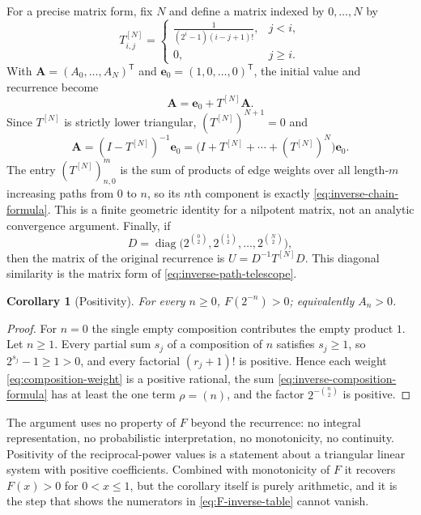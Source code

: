 \documentclass[11pt,oneside]{article}
\newtheorem{corollary}[theorem]{Corollary}
\theoremstyle{definition}
\theoremstyle{remark}
\begin{document}
For a precise matrix form, fix $N$ and define a matrix indexed by $0,\ldots,N$ by
\begin{equation*}
 T^{[N]}_{i,j}=\begin{cases}
 \displaystyle\frac1{(2^i-1)(i-j+1)!},&j<i,\\[5pt]
 0,&j\ge i.
 \end{cases}
\end{equation*}
With $\mathbf A=(A_0,\ldots,A_N)^{\mathsf T}$ and
$\mathbf e_0=(1,0,\ldots,0)^{\mathsf T}$, the initial value and recurrence become
\begin{equation*}
 \mathbf A=\mathbf e_0+T^{[N]}\mathbf A.
\end{equation*}
Since $T^{[N]}$ is strictly lower triangular, $(T^{[N]})^{N+1}=0$ and
\begin{equation*}
 \mathbf A=(I-T^{[N]})^{-1}\mathbf e_0
 =\bigl(I+T^{[N]}+\cdots+(T^{[N]})^N\bigr)\mathbf e_0.
\end{equation*}
The entry $(T^{[N]})^m_{n,0}$ is the sum of products of edge weights over all length-$m$
increasing paths from $0$ to $n$, so its $n$th component is exactly
\eqref{eq:inverse-chain-formula}.  This is a finite geometric identity for a nilpotent
matrix, not an analytic convergence argument.  Finally, if
\begin{equation*}
 D=\operatorname{diag}\bigl(2^{\binom02},2^{\binom12},\ldots,2^{\binom N2}\bigr),
\end{equation*}
then the matrix of the original recurrence is $U=D^{-1}T^{[N]}D$.  This diagonal
similarity is the matrix form of \eqref{eq:inverse-path-telescope}.


\begin{corollary}[Positivity]
\label{cor:dy-positivity}
For every $n\ge0$, $F(2^{-n})>0$; equivalently $A_n>0$.
\end{corollary}

\begin{proof}
For $n=0$ the single empty composition contributes the empty product $1$.  Let $n\ge1$.
Every partial sum $s_j$ of a composition of $n$ satisfies $s_j\ge1$, so $2^{s_j}-1\ge1>0$,
and every factorial $(r_j+1)!$ is positive.  Hence each weight
\eqref{eq:composition-weight} is a positive rational, the sum
\eqref{eq:inverse-composition-formula} has at least the one term $\rho=(n)$, and the factor
$2^{-\binom n2}$ is positive.
\end{proof}

The argument uses no property of $F$ beyond the recurrence: no integral representation, no
probabilistic interpretation, no monotonicity, no continuity.  Positivity of the
reciprocal-power values is a statement about a triangular linear system with positive
coefficients.  Combined with monotonicity of $F$ it recovers $F(x)>0$ for $0<x\le1$, but the
corollary itself is purely arithmetic, and it is the step that shows the numerators in
\eqref{eq:F-inverse-table} cannot vanish.
\end{document}
